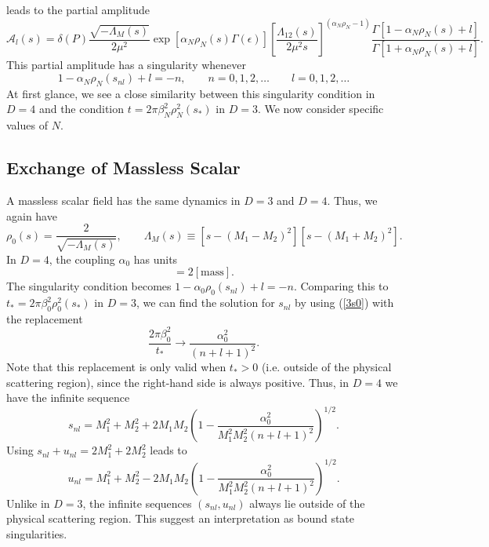 leads to the partial amplitude
\begin{equation}
	\mathcal{A}_{l}(s) = \delta(P) \frac{\sqrt{- \Lambda_{M}(s)}}{2 \mu^{2}} \exp{\left[ \alpha_{N} \rho_{N}(s) \Gamma(\epsilon) \right]} \left[ \frac{\Lambda_{12}(s)}{2 \mu^{2} s} \right]^{(\alpha_{N} \rho_{N} - 1)} \frac{\Gamma[1 - \alpha_{N} \rho_{N}(s) + l]}{\Gamma[1 + \alpha_{N} \rho_{N}(s) + l]}.
\end{equation}
This partial amplitude has a singularity whenever
\begin{equation}
	1 - \alpha_{N} \rho_{N}(s_{nl}) + l = - n, \qquad n = 0, 1, 2, \ldots \qquad l = 0, 1, 2, \ldots
\end{equation}
At first glance, we see a close similarity between this singularity condition in $D = 4$ and the condition $t = 2 \pi \beta_{N}^{2} \rho_{N}^{2}(s_{*})$ in $D = 3$. We now consider specific values of $N$.
\subsection{Exchange of Massless Scalar}
A massless scalar field has the same dynamics in $D = 3$ and $D = 4$. Thus, we again have
\begin{equation}
	\rho_{0}(s) = \frac{2}{\sqrt{-\Lambda_{M}(s)}}, \qquad \Lambda_{M}(s) \equiv [s - (M_{1} - M_{2})^{2}] [s - (M_{1} + M_{2})^{2}].
	\label{rho0D4}
\end{equation}
In $D = 4$, the coupling $\alpha_{0}$ has units
\begin{equation}
	[\alpha_{0}] = 2 [\text{mass}].
\end{equation}
The singularity condition becomes $1 - \alpha_{0} \rho_{0}(s_{nl}) + l = -n$. Comparing this to $t_{*} = 2 \pi \beta_{0}^{2} \rho_{0}^{2}(s_{*})$ in $D = 3$, we can find the solution for $s_{nl}$ by using (\ref{3s0}) with the replacement
\begin{equation}
	\frac{2 \pi \beta_{0}^{2}}{t_{*}} \longrightarrow \frac{\alpha_{0}^{2}}{(n + l + 1)^{2}}.
\end{equation}
Note that this replacement is only valid when $t_{*} > 0$ (i.e. outside of the physical scattering region), since the right-hand side is always positive. Thus, in $D = 4$ we have the infinite sequence
\begin{equation}
	s_{nl} = M_{1}^{2} + M_{2}^{2} + 2 M_{1} M_{2} \left(1 - \frac{\alpha_{0}^{2}}{M_{1}^{2} M_{2}^{2} (n + l + 1)^{2}} \right)^{1/2}.
	\label{sJ0}
\end{equation}
Using $s_{nl} + u_{nl} = 2M_{1}^{2} + 2M_{2}^{2}$ leads to
\begin{equation}
	u_{nl} = M_{1}^{2} + M_{2}^{2} - 2 M_{1} M_{2} \left(1 - \frac{\alpha_{0}^{2}}{M_{1}^{2} M_{2}^{2} (n + l + 1)^{2}} \right)^{1/2}.
\end{equation}
Unlike in $D = 3$, the infinite sequences $(s_{nl}, u_{nl})$ always lie outside of the physical scattering region. This suggest an interpretation as bound state singularities.

